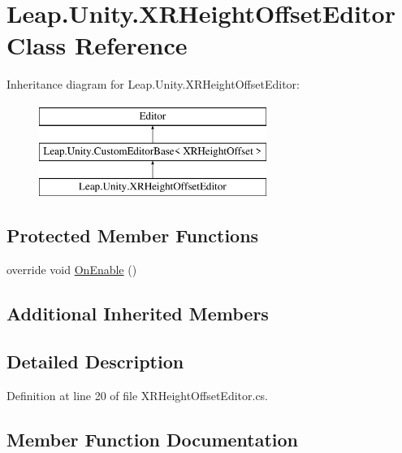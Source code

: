 \hypertarget{class_leap_1_1_unity_1_1_x_r_height_offset_editor}{}\section{Leap.\+Unity.\+X\+R\+Height\+Offset\+Editor Class Reference}
\label{class_leap_1_1_unity_1_1_x_r_height_offset_editor}
Inheritance diagram for Leap.\+Unity.\+X\+R\+Height\+Offset\+Editor\+:\begin{figure}[H]
\begin{center}
\leavevmode
\includegraphics[height=3.000000cm]{class_leap_1_1_unity_1_1_x_r_height_offset_editor}
\end{center}
\end{figure}
\subsection*{Protected Member Functions}
\begin{DoxyCompactItemize}
\item 
override void \mbox{\hyperlink{class_leap_1_1_unity_1_1_x_r_height_offset_editor_ae4889221d5f56937d6ad2c8c63bce7ba}{On\+Enable}} ()
\end{DoxyCompactItemize}
\subsection*{Additional Inherited Members}


\subsection{Detailed Description}


Definition at line 20 of file X\+R\+Height\+Offset\+Editor.\+cs.



\subsection{Member Function Documentation}
\mbox{\label{class_leap_1_1_unity_1_1_x_r_height_offset_editor_ae4889221d5f56937d6ad2c8c63bce7ba}} 
